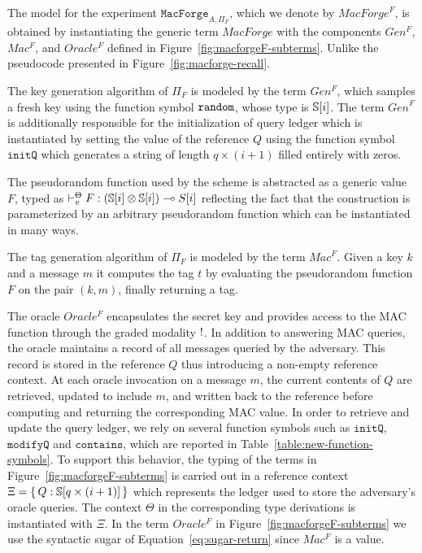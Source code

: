 The model for the experiment $\mathtt{MacForge}_{A,\Pi_F}$, which we denote by $\mathit{MacForge}^F$, is obtained by instantiating the generic term $\mathit{MacForge}$ with the components $Gen^F$, $Mac^F$, and $Oracle^F$ defined in Figure~\ref{fig:macforgeF-subterms}. Unlike the pseudocode presented in Figure~\ref{fig:macforge-recall}.

The key generation algorithm of $\Pi_F$ is modeled by the term $Gen^F$, which samples a fresh key using the function symbol $\mathtt{random}$, whose type is $\mathbb{S}[i]$. The term $\mathit{Gen}^F$ is additionally responsible for the initialization of query ledger which is instantiated by setting the value of the reference $Q$ using the function symbol $\mathtt{initQ}$ which generates a string of length $q\times(i+1)$ filled entirely with zeros.  

The pseudorandom function used by the scheme is abstracted as a generic value $F$, typed as $\vdash_v^\Theta F: (\mathbb{S}[i] \otimes \mathbb{S}[i]) \multimap S[i]$ reflecting the fact that the construction is parameterized by an arbitrary pseudorandom function which can be instantiated in many ways. 

The tag generation algorithm of $\Pi_F$ is modeled by the term $\mathit{Mac}^F$. Given a key $k$ and a message $m$ it computes the tag $t$ by evaluating the pseudorandom function $F$ on the pair $(k,m)$, finally returning a tag. 

The oracle $Oracle^F$ encapsulates the secret key and provides access to the MAC function through the graded modality $\mathord{!}$. In addition to answering MAC queries, the oracle maintains a record of all messages queried by the adversary. This record is stored in the reference $Q$ thus introducing a non-empty reference context. At each oracle invocation on a message $m$, the current contents of $Q$ are retrieved, updated to include $m$, and written back to the reference before computing and returning the corresponding MAC value. In order to retrieve and update the query ledger, we rely on several function symbols such as $\mathtt{initQ}$, $\mathtt{modifyQ}$ and $\mathtt{contains}$, which are reported in Table~\ref{table:new-function-symbols}. To support this behavior, the typing of the terms in Figure~\ref{fig:macforgeF-subterms} is carried out in a reference context $ \Xi = \{\, Q : \mathbb{S}[q\times(i+1)] \,\}$ which represents the ledger used to store the adversary's oracle queries. The context $\Theta$ in the corresponding type derivations is instantiated with $\Xi$. In the term $Oracle^F$ in Figure~\ref{fig:macforgeF-subterms} we use the syntactic sugar of Equation~\ref{eq:sugar-return} since $Mac^F$ is a value.


